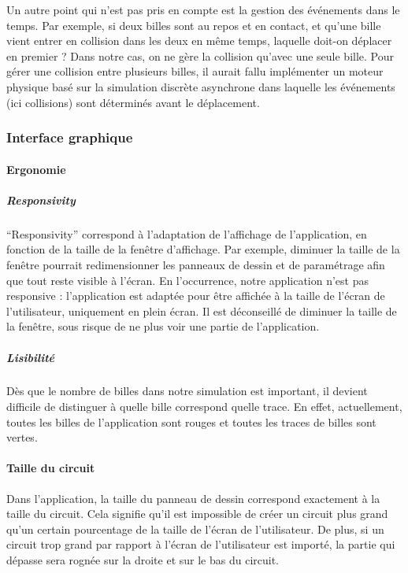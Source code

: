 \documentclass{report}
\begin{document}
Un autre point qui n’est pas pris en compte est la gestion des événements dans le temps. Par exemple, si deux billes sont au repos et en contact, et qu’une bille vient entrer en collision dans les deux en même temps, laquelle doit-on déplacer en premier ? Dans notre cas, on ne gère la collision qu’avec une seule bille. Pour gérer une collision entre plusieurs billes, il aurait fallu implémenter un moteur physique basé sur la simulation discrète asynchrone dans laquelle les événements (ici collisions) sont déterminés avant le déplacement.

\subsubsection{Interface graphique}

\paragraph{Ergonomie}

\subparagraph{Responsivity}

“Responsivity” correspond à l’adaptation de l’affichage de l’application, en fonction de la taille de la fenêtre d’affichage. Par exemple, diminuer la taille de la fenêtre pourrait redimensionner les panneaux de dessin et de paramétrage afin que tout reste visible à l’écran.
En l'occurrence, notre application n’est pas responsive : l’application est adaptée pour être affichée à la taille de l’écran de l’utilisateur, uniquement en plein écran. Il est déconseillé de diminuer la taille de la fenêtre, sous risque de ne plus voir une partie de l’application.

\subparagraph{Lisibilité}

Dès que le nombre de billes dans notre simulation est important, il devient difficile de distinguer à quelle bille correspond quelle trace. En effet, actuellement, toutes les billes de l’application sont rouges et toutes les traces de billes sont vertes.

\paragraph{Taille du circuit}

Dans l’application, la taille du panneau de dessin correspond exactement à la taille du circuit. Cela signifie qu’il est impossible de créer un circuit plus grand qu’un certain pourcentage de la taille de l’écran de l’utilisateur.
De plus, si un circuit trop grand par rapport à l’écran de l’utilisateur est importé, la partie qui dépasse sera rognée sur la droite et sur le bas du circuit.
\end{document}
